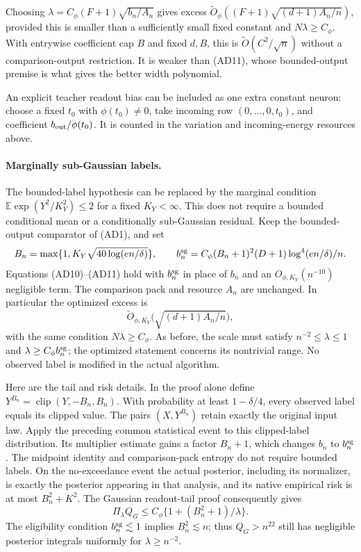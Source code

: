 Choosing $\lambda=C_\phi(F+1)\sqrt{b_n/A_n}$ gives excess
$\widetilde O_\phi((F+1)\sqrt{(d+1)A_n/n})$, provided this is
smaller than a sufficiently small fixed constant and
$N\lambda\ge C_\phi$. With entrywise coefficient cap $B$ and fixed
$d,B$, this is $\widetilde O(C^2/\sqrt n)$ without a comparison-output
restriction. It is weaker than (AD11), whose bounded-output premise
is what gives the better width polynomial.

An explicit teacher readout bias can be included as one extra constant
neuron: choose a fixed $t_0$ with $\phi(t_0)\ne0$, take incoming row
$(0,\ldots,0,t_0)$, and coefficient $b_{\rm out}/\phi(t_0)$.
It is counted in the variation and incoming-energy resources above.

\paragraph{Marginally sub-Gaussian labels.}
The bounded-label hypothesis can be replaced by the marginal condition
$\mathbb E\exp(Y^2/K_Y^2)\le2$ for a fixed $K_Y<\infty$.
This does not require a bounded conditional mean or a conditionally
sub-Gaussian residual. Keep the bounded-output comparator of (AD1), and set
\[
 B_n=\max\{1,K_Y\sqrt{40\log(e n/\delta)}\},\qquad
 b_n^{\rm sg}=C_\phi(B_n+1)^2(D+1)\log^4(e n/\delta)/n.
\]
Equations (AD10)--(AD11) hold with $b_n^{\rm sg}$ in place of $b_n$
and an $O_{\phi,K_Y}(n^{-10})$ negligible term. The comparison pack and
resource $A_n$ are unchanged. In particular the optimized excess is
\[
 \widetilde O_{\phi,K_Y}\bigl(\sqrt{(d+1)A_n/n}\bigr),               \tag{AD14}
\]
with the same condition $N\lambda\ge C_\phi$. As before, the scale must
satisfy $n^{-2}\le\lambda\le1$ and
$\lambda\ge C_\phi b_n^{\rm sg}$; the optimized statement concerns its
nontrivial range. No observed label is modified in the actual algorithm.

Here are the tail and risk details. In the proof alone define
$Y^{B_n}=\operatorname{clip}(Y,-B_n,B_n)$. With probability at least
$1-\delta/4$, every observed label equals its clipped value. The pairs
$(X,Y^{B_n})$ retain exactly the original input law. Apply the preceding
common statistical event to this clipped-label distribution. Its
multiplier estimate gains a factor $B_n+1$, which changes $b_n$ to
$b_n^{\rm sg}$. The midpoint identity and comparison-pack entropy do
not require bounded labels. On the no-exceedance event the actual
posterior, including its normalizer, is exactly the posterior appearing
in that analysis, and its native empirical risk is at most $B_n^2+K^2$.
The Gaussian readout-tail proof consequently gives
\[
 \Pi_\lambda Q_G\le C_\phi\{1+(B_n^2+1)/\lambda\}.
\]
The eligibility condition $b_n^{\rm sg}\lesssim1$ implies $B_n^2\lesssim n$;
thus $Q_G>n^{22}$ still has negligible posterior integrals uniformly
for $\lambda\ge n^{-2}$.

